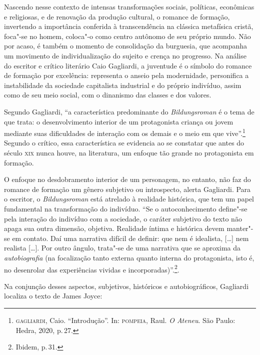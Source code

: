 Nascendo nesse contexto de intensas transformações sociais, políticas, econômicas e religiosas, e de renovação da produção cultural, o romance de formação, invertendo a importância conferida à transcendência na clássica metafísica cristã, foca"-se no homem, coloca"-o como centro autônomo de seu próprio mundo. Não por acaso, é também o momento de consolidação da burguesia, que acompanha um movimento de individualização do sujeito e crença no progresso. Na análise do escritor e crítico literário Caio Gagliardi, a juventude é o símbolo do romance de formação por excelência: representa o anseio pela modernidade, personifica a instabilidade da sociedade capitalista industrial e do próprio indivíduo, assim como de seu meio social, com o dinanismo das classes e dos valores.

Segundo Gagliardi, ``a característica predominante do
\textit{Bildungsroman} é o tema de que
trata: o desenvolvimento interior de um protagonista criança ou jovem
mediante suas dificuldades de interação com os demais e o meio em que vive''.\footnote{\textsc{gagliardi}, Caio. ``Introdução''. In: \textsc{pompeia}, Raul. \textit{O Ateneu}. São Paulo: Hedra, 2020, p.\,27.} Segundo o crítico, essa característica se evidencia ao se constatar que antes do século \textsc{xix} nunca houve, na literatura, um enfoque tão grande no protagonista em formação.

O enfoque no desdobramento interior de um personagem, no entanto, não faz do romance de formação um gênero subjetivo ou introspecto, alerta Gagliardi. 
Para o escritor, o \textit{Bildungsroman} está atrelado à realidade histórica, que tem um papel fundamental na transformação do indivíduo. ``Se o autoconhecimento define"-se
pela interação do indivíduo com a sociedade, o caráter subjetivo do
texto não apaga sua outra dimensão, objetiva. Realidade íntima e
histórica devem manter"-se em contato. Daí uma narrativa difícil de
definir: que nem é idealista, [\ldots] nem realista [\ldots]. Por outro ângulo, trata"-se de uma narrativa que se aproxima da \textit{autobiografia} (na focalização tanto externa 
quanto interna do protagonista, isto é, no desenrolar das experiências vividas e incorporadas)''.\footnote{Ibidem, p.\,31.}.

Na conjunção desses aspectos, subjetivos, históricos e autobiográficos, Gagliardi localiza o texto de James Joyce:

